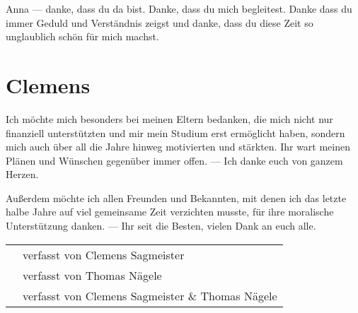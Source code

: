 Anna --- danke, dass du da bist. Danke, dass du mich begleitest. Danke dass du immer Geduld und Verständnis zeigst und danke, dass du diese Zeit so unglaublich schön für mich machst. 

\vfill

\section*{Clemens}
Ich möchte mich besonders bei meinen Eltern bedanken, die mich nicht nur finanziell unterstützten und mir mein Studium erst ermöglicht haben, sondern mich auch über all die Jahre hinweg motivierten und stärkten. Ihr wart meinen Plänen und Wünschen gegenüber immer offen. --- Ich danke euch von ganzem Herzen.

Außerdem möchte ich allen Freunden und Bekannten, mit denen ich das letzte halbe Jahre auf viel gemeinsame Zeit verzichten musste, für ihre moralische Unterstützung danken. --- Ihr seit die Besten, vielen Dank an euch alle.

\endgroup


\hfill

\vfill

\vspace*{0.5cm}

\begin{center}
\begin{footnotesize}
	\textcolor{Gray}{
		\begin{tabular}{rp{7cm}}
			\cs & verfasst von Clemens Sagmeister \\
			\tn & verfasst von Thomas Nägele \\
			\cs \tn & verfasst von Clemens Sagmeister \& Thomas Nägele \\
		\end{tabular} }
\end{footnotesize}
\end{center}


